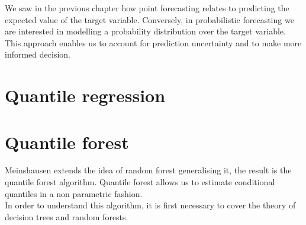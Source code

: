 We saw in the previous chapter how point forecasting relates to predicting the expected value of the target variable.
Conversely, in probabilistic forecasting we are interested in modelling a probability distribution over the target variable.
This approach enables us to account for prediction uncertainty and to make more informed decision.
\section{Quantile regression}


\section{Quantile forest}
Meinshausen \cite{meinshausen2006quantile} extends the idea of random forest \cite{breiman2001random} generalising it, the result is the quantile forest algorithm. Quantile forest allows us to estimate conditional quantiles in a non parametric fashion.
\\
In order to understand this algorithm, it is first necessary to cover the theory of decision trees and random forests.
